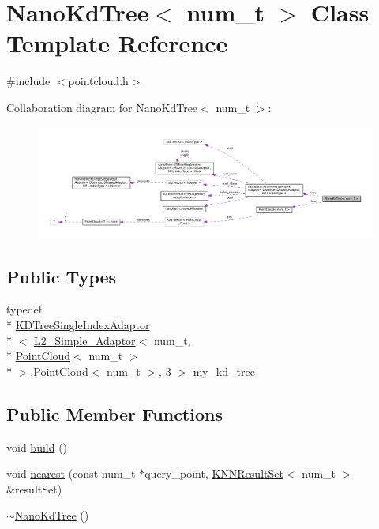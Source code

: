 \hypertarget{class_nano_kd_tree}{\section{Nano\-Kd\-Tree$<$ num\-\_\-t $>$ Class Template Reference}
\label{class_nano_kd_tree}
}


{\ttfamily \#include $<$pointcloud.\-h$>$}



Collaboration diagram for Nano\-Kd\-Tree$<$ num\-\_\-t $>$\-:\nopagebreak
\begin{figure}[H]
\begin{center}
\leavevmode
\includegraphics[width=350pt]{class_nano_kd_tree__coll__graph}
\end{center}
\end{figure}
\subsection*{Public Types}
\begin{DoxyCompactItemize}
\item 
typedef \\*
\hyperlink{classnanoflann_1_1_k_d_tree_single_index_adaptor}{K\-D\-Tree\-Single\-Index\-Adaptor}\\*
$<$ \hyperlink{structnanoflann_1_1_l2___simple___adaptor}{L2\-\_\-\-Simple\-\_\-\-Adaptor}$<$ num\-\_\-t, \\*
\hyperlink{struct_point_cloud}{Point\-Cloud}$<$ num\-\_\-t $>$\\*
 $>$,\hyperlink{struct_point_cloud}{Point\-Cloud}$<$ num\-\_\-t $>$, 3 $>$ \hyperlink{class_nano_kd_tree_a31489b03f921330be3b4895011e18eb7}{my\-\_\-kd\-\_\-tree}
\end{DoxyCompactItemize}
\subsection*{Public Member Functions}
\begin{DoxyCompactItemize}
\item 
void \hyperlink{class_nano_kd_tree_a1f6e888c847903c0a0d965f3bef5bef2}{build} ()
\item 
void \hyperlink{class_nano_kd_tree_adeb9a7b244da0ee8987ab98fdb775609}{nearest} (const num\-\_\-t $\ast$query\-\_\-point, \hyperlink{classnanoflann_1_1_k_n_n_result_set}{K\-N\-N\-Result\-Set}$<$ num\-\_\-t $>$ \&result\-Set)
\item 
\hyperlink{class_nano_kd_tree_a524914051c4b2927846dbf078e0a3859}{$\sim$\-Nano\-Kd\-Tree} ()
\end{DoxyCompactItemize}

